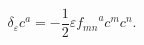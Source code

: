 \begin{equation}
\delta_{\varepsilon} c^{a}  = -\frac{1}{2} \varepsilon {f_{mn}}^{a} c^{m} c^{n}.      
\end{equation}

